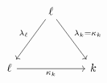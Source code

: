 \[\begin{tikzcd}
	& \ell \\
	\\
	\ell && k
	\arrow["{\kappa_{k}}"', from=3-1, to=3-3]
	\arrow["{\lambda_{k} = \kappa_{k}}", from=1-2, to=3-3]
	\arrow["{\lambda_{\ell}}"', from=1-2, to=3-1]
\end{tikzcd}\]